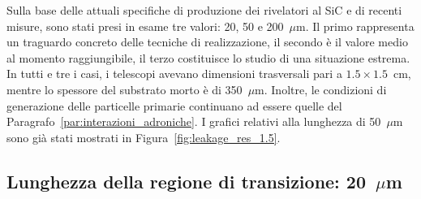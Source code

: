 Sulla base delle attuali specifiche di produzione dei rivelatori al SiC e di recenti misure, sono stati presi in esame tre valori: 20, 50 e 200~$\mu$m.
Il primo rappresenta un traguardo concreto delle tecniche di realizzazione, il secondo è il valore medio al momento raggiungibile, il terzo costituisce lo studio di una situazione estrema.
In tutti e tre i casi, i telescopi avevano dimensioni trasversali pari a $1.5 \times 1.5$~cm, mentre lo spessore del substrato morto è di 350~$\mu$m.
Inoltre, le condizioni di generazione delle particelle primarie continuano ad essere quelle del Paragrafo~\ref{par:interazioni_adroniche}.
I grafici relativi alla lunghezza di 50~$\mu$m sono già stati mostrati in Figura~\ref{fig:leakage_res_1.5}.



\subsection*{Lunghezza della regione di transizione: 20~$\mu$m}





